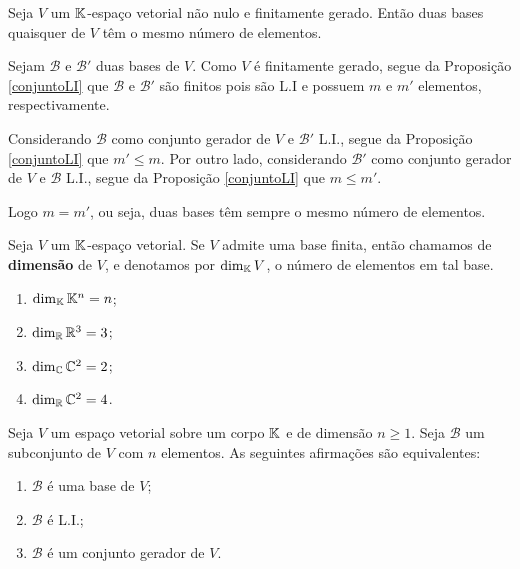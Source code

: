 \begin{corolario}
	Seja $V$ um $\mathbb{K}$-espa\c{c}o vetorial n\~ao nulo e finitamente gerado. Ent\~ao duas bases quaisquer de $V$ t\^em o mesmo n\'umero de elementos.
\end{corolario}
\begin{prova}
	Sejam $\mathcal{B}$ e $\mathcal{B}'$ duas bases de $V$. Como $V$ \'e finitamente gerado, segue da Proposi\c{c}\~ao \ref{conjuntoLI} que $\mathcal{B}$ e $\mathcal{B}'$ s\~ao finitos pois s\~ao L.I e possuem $m$ e $m'$ elementos, respectivamente.

	Considerando $\mathcal{B}$ como conjunto gerador de $V$ e $\mathcal{B}'$ L.I., segue da Proposi\c{c}\~ao \ref{conjuntoLI} que $m' \le m$. Por outro lado, considerando $\mathcal{B}'$ como conjunto gerador de $V$ e $\mathcal{B}$ L.I., segue da Proposi\c{c}\~ao \ref{conjuntoLI} que $m 
	\le m'$.

	Logo $m = m'$, ou seja, duas bases t\^em sempre o mesmo n\'umero de elementos.
\end{prova}

\begin{definicao}
	Seja $V$ um $\mathbb{K}$-espa\c{c}o vetorial. Se $V$ admite uma base finita, ent\~ao chamamos de \textbf{dimens\~ao} de $V$, e denotamos por $\dim_{\mathbb{K}} V$, o n\'umero de elementos em tal base.
\end{definicao}

\begin{exemplo}
	\begin{enumerate}
		\item $\dim_{\mathbb{K}}\mathbb{K}^n = n$;
		\item $\dim_{\mathbb{R}}\mathbb{R}^3 = 3$;
		\item $\dim_{\mathbb{C}}\mathbb{C}^2 = 2$;
		\item $\dim_{\mathbb{R}}\mathbb{C}^2 = 4$.
	\end{enumerate}
\end{exemplo}

\begin{corolario}
	Seja $V$ um espa\c{c}o vetorial sobre um corpo $\mathbb{K}$ e de dimens\~ao $n \ge 1$. Seja $\mathcal{B}$ um subconjunto de $V$ com $n$ elementos. As seguintes afirma\c{c}\~oes s\~ao equivalentes:
	\begin{enumerate}
		\item $\mathcal{B}$ \'e uma base de $V$;
		\item $\mathcal{B}$ \'e L.I.;
		\item $\mathcal{B}$ \'e um conjunto gerador de $V$.
	\end{enumerate}
\end{corolario}

